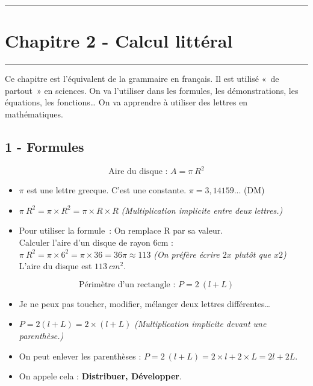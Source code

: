 \documentclass[11pt]{article}
\newcommand{\horrule}[1]{\rule{\linewidth}{#1}} %
\begin{document}

\newtheorem{Definition}{Définition}
\newtheorem{Theorem}{Théorème}
\newtheorem{Proposition}{Propriété}

\renewcommand{\labelitemi}{$\bullet$}
\renewcommand{\labelitemii}{$\circ$}

\setlength{\columnseprule}{1pt}

\horrule{2px}
\section*{Chapitre 2 - Calcul littéral}
\horrule{2px}


Ce chapitre est l’équivalent de la grammaire en français. Il est utilisé « de partout » en sciences. On va l’utiliser dans les formules, les démonstrations, les équations, les fonctions… On va apprendre à utiliser des lettres en mathématiques.

\subsection*{1 - Formules}

$$\text{Aire du disque : }A = \pi ~ R^2$$

\begin{itemize}
\item $\pi$ est une lettre grecque. C’est une constante. $\pi = 3,14159 ...$ (DM)
\item $\pi ~ R^2 = \pi \times R^2 = \pi \times R \times R $ \textit{(Multiplication implicite entre deux lettres.)}
\item Pour utiliser la formule : On remplace R par sa valeur. \\
  Calculer l'aire d'un disque de rayon 6cm :\\
  $\pi ~ R^2 = \pi \times 6^2 =\pi \times 36 = 36\pi \approx 113$ \textit{(On préfère écrire $2x$ plutôt que $x2$)} \\
  L'aire du disque est $113 ~ cm^2$.
\end{itemize} 

$$\text{Périmètre d’un rectangle : }P = 2 ~ (l + L)$$
\begin{itemize}
\item Je ne peux pas toucher, modifier, mélanger deux lettres différentes…
\item $P = 2(l + L) = 2 \times (l + L)$ \textit{(Multiplication implicite devant une parenthèse.)}
\item On peut enlever les parenthèses : $P = 2 ~ (l + L) = 2\times l + 2\times L = 2l + 2L$.
\item On appele cela : \textbf{Distribuer, Développer}.
\end{itemize}
\end{document}
